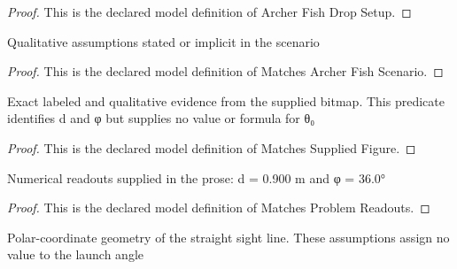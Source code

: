 \begin{proof}
  This is the declared model definition of Archer Fish Drop Setup.
\end{proof}
\begin{definition}
  \label{def:physics:phyx-mini-0742:phyxminiproblems-problemphyxmini0742-matchesarcherfishscenario}
  Qualitative assumptions stated or implicit in the scenario
\end{definition}
\begin{proof}
  This is the declared model definition of Matches Archer Fish Scenario.
\end{proof}
\begin{definition}
  \label{def:physics:phyx-mini-0742:phyxminiproblems-problemphyxmini0742-matchessuppliedfigure}
  Exact labeled and qualitative evidence from the supplied bitmap. This predicate identifies d and φ but supplies no value or formula for θ₀
\end{definition}
\begin{proof}
  This is the declared model definition of Matches Supplied Figure.
\end{proof}
\begin{definition}
  \label{def:physics:phyx-mini-0742:phyxminiproblems-problemphyxmini0742-matchesproblemreadouts}
  Numerical readouts supplied in the prose: d = 0.900 m and φ = 36.0°
\end{definition}
\begin{proof}
  This is the declared model definition of Matches Problem Readouts.
\end{proof}
\begin{definition}
  \label{def:physics:phyx-mini-0742:phyxminiproblems-problemphyxmini0742-satisfiessightlinegeometry}
  Polar-coordinate geometry of the straight sight line. These assumptions assign no value to the launch angle
\end{definition}
